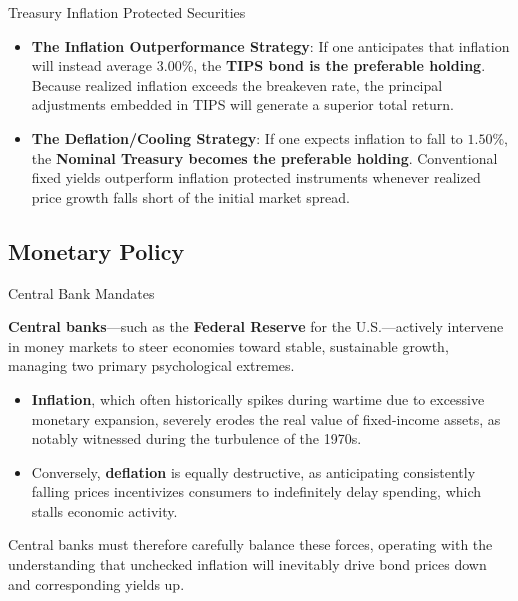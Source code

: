 \documentclass[10pt]{article}
\begin{document}
\begin{core}{Treasury Inflation Protected Securities}
\begin{itemize}
        \item \textbf{The Inflation Outperformance Strategy}: If one anticipates that inflation will instead average $3.00\%$, the \textbf{TIPS bond is the preferable holding}. Because realized inflation exceeds the breakeven rate, the principal adjustments embedded in TIPS will generate a superior total return.

        \item \textbf{The Deflation/Cooling Strategy}: If one expects inflation to fall to $1.50\%$, the \textbf{Nominal Treasury becomes the preferable holding}. Conventional fixed yields outperform inflation protected instruments whenever realized price growth falls short of the initial market spread.

      \end{itemize}

    \end{core}

  \subsection{Monetary Policy}

    \begin{core}{Central Bank Mandates}

      \textbf{Central banks}---such as the \textbf{Federal Reserve} for the U.S.---actively intervene in money markets to steer economies toward stable, sustainable growth, managing two primary psychological extremes.

      \begin{itemize}

        \item \textbf{Inflation}, which often historically spikes during wartime due to excessive monetary expansion, severely erodes the real value of fixed-income assets, as notably witnessed during the turbulence of the 1970s. 

        \item Conversely, \textbf{deflation} is equally destructive, as anticipating consistently falling prices incentivizes consumers to indefinitely delay spending, which stalls economic activity. 

      \end{itemize}

      Central banks must therefore carefully balance these forces, operating with the understanding that unchecked inflation will inevitably drive bond prices down and corresponding yields up.

    \end{core}
\end{document}
